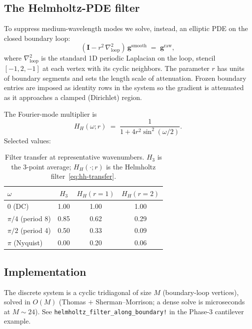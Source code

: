 \documentclass[11pt,a4paper]{article}
\newcommand{\mat}[1]{\mathbf{#1}}
\newcommand{\vect}[1]{\boldsymbol{#1}}
\begin{document}
\subsection{The Helmholtz-PDE filter}

To suppress medium-wavelength modes we solve, instead, an elliptic
PDE on the closed boundary loop:
\begin{equation}
  (\mat I - r^2\,\nabla^2_{\text{loop}})\, \vect g^{\text{smooth}}
  \;=\; \vect g^{\text{raw}},
  \label{eq:helmholtz}
\end{equation}
where $\nabla^2_{\text{loop}}$ is the standard 1D periodic Laplacian
on the loop, stencil $[-1, 2, -1]$ at each vertex with its cyclic
neighbors. The parameter $r$ has units of boundary segments and
sets the length scale of attenuation. Frozen boundary entries are
imposed as identity rows in the system so the gradient is
attenuated as it approaches a clamped (Dirichlet) region.

The Fourier-mode multiplier is
\begin{equation}
  H_H(\omega; r) \;=\; \frac{1}{1 + 4r^2\sin^2(\omega/2)}.
  \label{eq:hh-transfer}
\end{equation}
Selected values:

\begin{table}[h]
\centering
\caption{Filter transfer at representative wavenumbers.
$H_3$ is the 3-point average; $H_H(\cdot;r)$ is the Helmholtz
filter~\eqref{eq:hh-transfer}.}
\label{tab:filter-transfer}
\begin{tabular}{lccc}
\toprule
$\omega$ & $H_3$ & $H_H(r=1)$ & $H_H(r=2)$ \\
\midrule
$0$           (DC)            & 1.00 & 1.00 & 1.00 \\
$\pi/4$       (period 8)      & 0.85 & 0.62 & 0.29 \\
$\pi/2$       (period 4)      & 0.50 & 0.33 & 0.09 \\
$\pi$         (Nyquist)       & 0.00 & 0.20 & 0.06 \\
\bottomrule
\end{tabular}
\end{table}

\subsection{Implementation}

The discrete system is a cyclic tridiagonal of size $M$ (boundary-loop vertices),
solved in $O(M)$ (Thomas $+$ Sherman--Morrison; a dense solve is microseconds at
$M\sim24$). See \texttt{helmholtz\_filter\_along\_boundary!} in the Phase-3
cantilever example.
\end{document}
